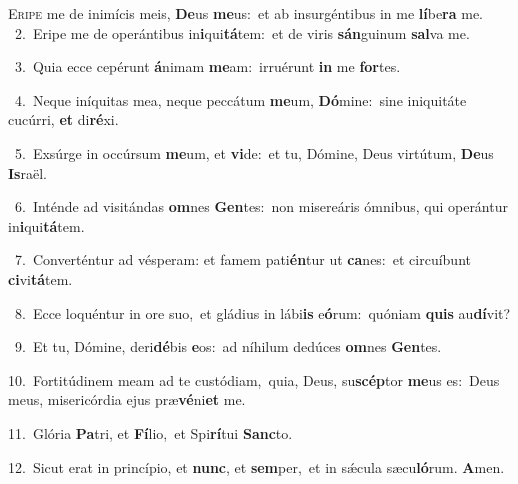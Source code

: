 \lettrine{\initial\textcolor{\initialcolor}{E}}{ripe} me de inimícis meis, \textbf{De}\-us \textbf{me}\-us:~\star et ab insurgéntibus in me \textbf{lí}\-be\textbf{ra} me.\\
{\numbfont\textcolor{\numbcolor}{~2.}}~Eripe me de operántibus in\-\textbf{i}\-qui\-\textbf{tá}\-tem:~\star et de viris \textbf{sán}\-guinum \textbf{sal}\-va me.\par
{\numbfont\textcolor{\numbcolor}{~3.}}~Quia ecce cepérunt \textbf{á}\-nimam \textbf{me}\-am:~\star irruérunt \textbf{in} me \textbf{for}\-tes.\par
{\numbfont\textcolor{\numbcolor}{~4.}}~Neque iníquitas mea, neque peccátum \textbf{me}\-um, \textbf{Dó}\-mine:~\star sine iniquitáte cucúrri, \textbf{et} di\-\textbf{ré}\-xi.\par
{\numbfont\textcolor{\numbcolor}{~5.}}~Exsúrge in occúrsum \textbf{me}\-um, et \textbf{vi}\-de:~\star et tu, Dómine, Deus virtútum, \textbf{De}\-us \textbf{Is}\-raël.\par
{\numbfont\textcolor{\numbcolor}{~6.}}~Inténde ad visitándas \textbf{om}\-nes \textbf{Gen}\-tes:~\star non misereáris ómnibus, qui operántur in\-\textbf{i}\-qui\-\textbf{tá}\-tem.\par
{\numbfont\textcolor{\numbcolor}{~7.}}~Converténtur ad vésperam: et famem pati\-\textbf{én}\-tur ut \textbf{ca}\-nes:~\star et circuíbunt \textbf{ci}\-vi\-\textbf{tá}\-tem.\par
{\numbfont\textcolor{\numbcolor}{~8.}}~Ecce loquéntur in ore suo,~\dagger et gládius in lábi\textbf{is} e\-\textbf{ó}\-rum:~\star quóniam \textbf{quis} au\-\textbf{dí}\-vit?\par
{\numbfont\textcolor{\numbcolor}{~9.}}~Et tu, Dómine, deri\-\textbf{dé}\-bis \textbf{e}\-os:~\star ad níhilum dedúces \textbf{om}\-nes \textbf{Gen}\-tes.\par
{\numbfont\textcolor{\numbcolor}{10.}}~Fortitúdinem meam ad te custódiam,~\dagger quia, Deus, su\-\textbf{scép}\-tor \textbf{me}\-us es:~\star Deus meus, misericórdia ejus præ\-\textbf{vé}\-ni\textbf{et} me.\par
{\numbfont\textcolor{\numbcolor}{11.}}~Glória \textbf{Pa}\-tri, et \textbf{Fí}\-lio,~\star et Spi\-\textbf{rí}\-tui \textbf{Sanc}\-to.\par
{\numbfont\textcolor{\numbcolor}{12.}}~Sicut erat in princípio, et \textbf{nunc}\-, et \textbf{sem}\-per,~\star et in sǽcula sæcu\-\textbf{ló}\-rum. \textbf{A}\-men.\par
